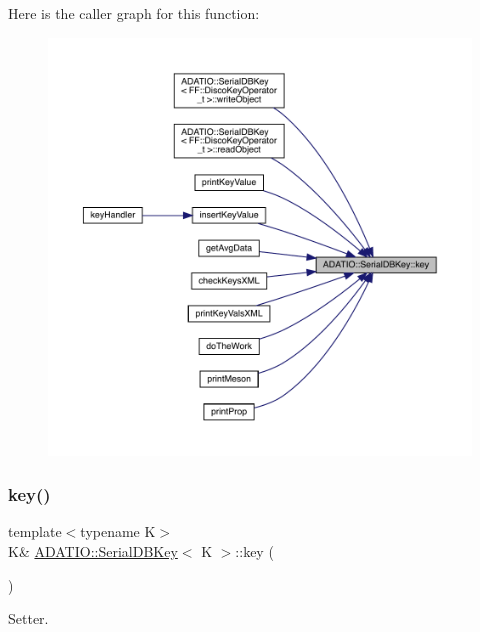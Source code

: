Here is the caller graph for this function\+:\nopagebreak
\begin{figure}[H]
\begin{center}
\leavevmode
\includegraphics[width=350pt]{d1/deb/classADATIO_1_1SerialDBKey_a9dc566bd8bc83d98d4438d220012648a_icgraph}
\end{center}
\end{figure}
\mbox{\label{classADATIO_1_1SerialDBKey_a9dc566bd8bc83d98d4438d220012648a}} 
\subsubsection{\texorpdfstring{key()}{key()}\hspace{0.1cm}{\footnotesize\ttfamily [2/4]}}
{\footnotesize\ttfamily template$<$typename K$>$ \\
K\& \mbox{\hyperlink{classADATIO_1_1SerialDBKey}{A\+D\+A\+T\+I\+O\+::\+Serial\+D\+B\+Key}}$<$ K $>$\+::key (\begin{DoxyParamCaption}{ }\end{DoxyParamCaption})\hspace{0.3cm}{\ttfamily [inline]}}



Setter. 

